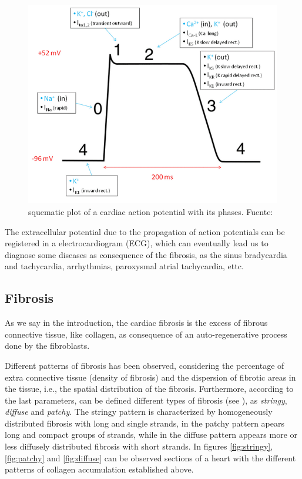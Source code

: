 \documentclass[letterpaper, twoside]{article}     	    %
\begin{document}
\begin{figure}[H]
\centering
\includegraphics[height = 7 cm]{fig/fundamentals-action_potential}
\caption{squematic plot of a cardiac action potential with its phases. Fuente: \cite{action-potential-figure}} \label{action-potential}
\end{figure}

The extracellular potential due to the propagation of action potentials can be registered in a electrocardiogram (ECG), which can eventually lead us to diagnose some diseases as consequence of the fibrosis, as the sinus bradycardia and tachycardia, arrhythmias, paroxysmal atrial tachycardia, ettc.

\subsection{Fibrosis} \label{Fibrosis}

As we say in the introduction, the cardiac fibrosis is the excess of fibrous connective tissue, like collagen, as consequence of an auto-regenerative process done by the fibroblasts. 

Different patterns of fibrosis has been observed, considering the percentage of extra connective tissue (density of fibrosis) and the dispersion of fibrotic areas in the tissue, i.e., the spatial distribution of the fibrosis. Furthermore, according to the last parameters, can be defined  different types of fibrosis (see \cite{Kawara2001Circ}), as \textsl{stringy}, \textsl{diffuse} and \textsl{patchy}. The stringy pattern is characterized by homogeneously distributed fibrosis with long and single strands, in the patchy pattern apears long and compact groups of strands, while in the diffuse pattern appears more or less diffusely distributed fibrosis with short strands. In figures \ref{fig:stringy}, \ref{fig:patchy} and \ref{fig:diffuse} can be observed sections of a heart with the different patterns of collagen accumulation established above. 
\end{document}
